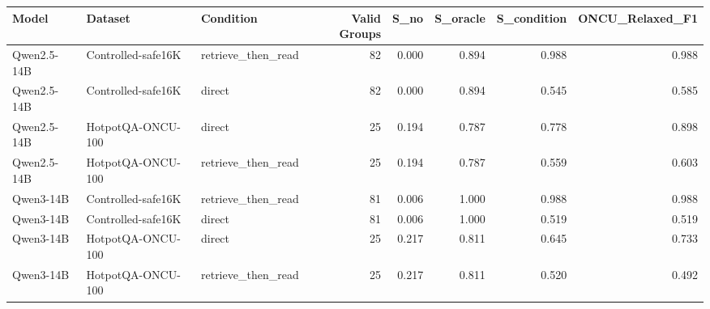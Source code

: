 \begin{tabular}{lllrrrrr}
\toprule
Model & Dataset & Condition & Valid Groups & S_no & S_oracle & S_condition & ONCU_Relaxed_F1 \\
\midrule
Qwen2.5-14B & Controlled-safe16K & retrieve_then_read & 82 & 0.000 & 0.894 & 0.988 & 0.988 \\
Qwen2.5-14B & Controlled-safe16K & direct & 82 & 0.000 & 0.894 & 0.545 & 0.585 \\
Qwen2.5-14B & HotpotQA-ONCU-100 & direct & 25 & 0.194 & 0.787 & 0.778 & 0.898 \\
Qwen2.5-14B & HotpotQA-ONCU-100 & retrieve_then_read & 25 & 0.194 & 0.787 & 0.559 & 0.603 \\
Qwen3-14B & Controlled-safe16K & retrieve_then_read & 81 & 0.006 & 1.000 & 0.988 & 0.988 \\
Qwen3-14B & Controlled-safe16K & direct & 81 & 0.006 & 1.000 & 0.519 & 0.519 \\
Qwen3-14B & HotpotQA-ONCU-100 & direct & 25 & 0.217 & 0.811 & 0.645 & 0.733 \\
Qwen3-14B & HotpotQA-ONCU-100 & retrieve_then_read & 25 & 0.217 & 0.811 & 0.520 & 0.492 \\
\bottomrule
\end{tabular}
